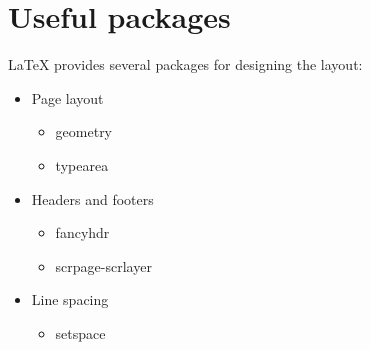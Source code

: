 \documentclass{article}
\begin{document}
\section*{Useful packages}
LaTeX provides several packages for designing the layout:
\begin{itemize}
  \item Page layout
    \begin{itemize}
      \item geometry
      \item typearea
    \end{itemize}
  \item Headers and footers
    \begin{itemize}
      \item fancyhdr
      \item scrpage-scrlayer
    \end{itemize}
  \item Line spacing
    \begin{itemize}
      \item setspace
    \end{itemize}
\end{itemize}
\end{document}
